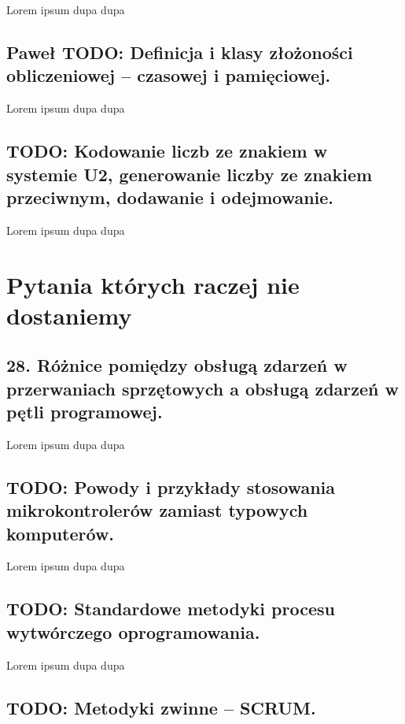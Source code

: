 \documentclass[a4paper,12pt,oneside]{book}
\begin{document}
		    Lorem ipsum dupa dupa
		
		\setcounter{section}{46}
		\section{\color{green}Paweł \color{red} TODO: Definicja i klasy złożoności obliczeniowej – czasowej i pamięciowej. }
		    
		    Lorem ipsum dupa dupa
		
		\setcounter{section}{55}
		\section{\color{red} TODO: Kodowanie liczb ze znakiem w systemie U2, generowanie liczby ze znakiem przeciwnym, dodawanie i odejmowanie. }
		    
		    Lorem ipsum dupa dupa
		
	\chapter{Pytania których raczej nie dostaniemy}
	
	\setcounter{section}{27}
	\section{28. Różnice pomiędzy obsługą zdarzeń w przerwaniach sprzętowych a obsługą zdarzeń w pętli programowej.}
					
					Lorem ipsum dupa dupa
	
	\setcounter{section}{28}
	\section{\color{red} TODO: Powody i przykłady stosowania mikrokontrolerów zamiast typowych komputerów. }
					
					Lorem ipsum dupa dupa
	
	\setcounter{section}{38}
	\section{\color{red} TODO: Standardowe metodyki procesu wytwórczego oprogramowania. }
					
					Lorem ipsum dupa dupa
	
	\setcounter{section}{39}
	\section{\color{red} TODO: Metodyki zwinne – SCRUM. }
					
\end{document}
